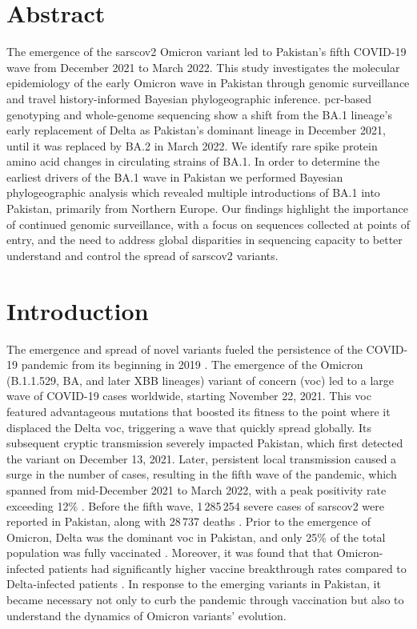 \section{Abstract}
The emergence of the \gls{sarscov2} Omicron variant led to Pakistan's fifth COVID-19 wave from December 2021 to March 2022.
This study investigates the molecular epidemiology of the early Omicron wave in Pakistan through genomic surveillance and travel history-informed Bayesian phylogeographic inference.
\gls{pcr}-based genotyping and whole-genome sequencing show a shift from the BA.1 lineage's early replacement of Delta as Pakistan's dominant lineage in December 2021, until it was replaced by BA.2 in March 2022.
We identify rare spike protein amino acid changes in circulating strains of BA.1.
In order to determine the earliest drivers of the BA.1 wave in Pakistan we performed Bayesian phylogeographic analysis which revealed multiple introductions of BA.1 into Pakistan, primarily from Northern Europe.
Our findings highlight the importance of continued genomic surveillance, with a focus on sequences collected at points of entry, and the need to address global disparities in sequencing capacity to better understand and control the spread of \gls{sarscov2} variants.


\section{Introduction}
The emergence and spread of novel variants fueled the persistence of the COVID-19 pandemic from its beginning in 2019 \citep{harvey2021sars, tao2021biological}.
The emergence of the Omicron (B.1.1.529, BA, and later XBB lineages) variant of concern (\gls{voc}) led to a large wave of COVID-19 cases worldwide, starting November 22, 2021.
This \gls{voc} featured advantageous mutations that boosted its fitness \citep{dhawan2022Omicron,francisco2022emergence} to the point where it displaced the Delta \gls{voc}, triggering a wave that quickly spread globally.
Its subsequent cryptic transmission severely impacted Pakistan, which first detected the variant on December 13, 2021.
Later, persistent local transmission caused a surge in the number of cases, resulting in the fifth wave of the pandemic, which spanned from mid-December 2021 to March 2022, with a peak positivity rate exceeding 12\% \citep{ourworldindataPK}.
Before the fifth wave, 1\,285\,254 severe cases of \gls{sarscov2} were reported in Pakistan, along with 28\,737 deaths \citep{ourworldindataPK}.
Prior to the emergence of Omicron, Delta was the dominant \gls{voc} in Pakistan, and only 25\% of the total population was fully vaccinated \citep{covid-pakistan-stats}.
Moreover, it was found that that Omicron-infected patients had significantly higher vaccine breakthrough rates compared to Delta-infected patients \citep{christensen2022signals}.
In response to the emerging variants in Pakistan, it became necessary not only to curb the pandemic through vaccination but also to understand the dynamics of Omicron variants' evolution.

